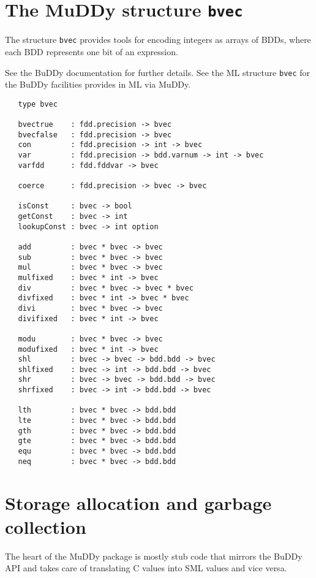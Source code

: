 \documentclass[12pt]{article}
\renewcommand{\t}[1]{\mbox{\tt #1}}
\newcommand{\Buddy}{BuDDy\xspace}
\newcommand{\Muddy}{MuDDy\xspace}
\begin{document}
\section{The \Muddy{} structure \t{bvec}}\label{bvec}

The structure \t{bvec} provides tools for encoding integers as arrays
of BDDs, where each BDD represents one bit of an expression.

See the \Buddy{} documentation \cite{BuDDy} for further details. See the ML structure \t{bvec}
for the \Buddy{} facilities provides in ML via \Muddy{}.

{\footnotesize
\begin{verbatim}
   type bvec

   bvectrue    : fdd.precision -> bvec 
   bvecfalse   : fdd.precision -> bvec 
   con         : fdd.precision -> int -> bvec
   var         : fdd.precision -> bdd.varnum -> int -> bvec
   varfdd      : fdd.fddvar -> bvec

   coerce      : fdd.precision -> bvec -> bvec

   isConst     : bvec -> bool
   getConst    : bvec -> int
   lookupConst : bvec -> int option

   add         : bvec * bvec -> bvec
   sub         : bvec * bvec -> bvec
   mul         : bvec * bvec -> bvec
   mulfixed    : bvec * int -> bvec
   div         : bvec * bvec -> bvec * bvec
   divfixed    : bvec * int -> bvec * bvec
   divi        : bvec * bvec -> bvec
   divifixed   : bvec * int -> bvec

   modu        : bvec * bvec -> bvec
   modufixed   : bvec * int -> bvec
   shl         : bvec -> bvec -> bdd.bdd -> bvec
   shlfixed    : bvec -> int -> bdd.bdd -> bvec
   shr         : bvec -> bvec -> bdd.bdd -> bvec
   shrfixed    : bvec -> int -> bdd.bdd -> bvec

   lth         : bvec * bvec -> bdd.bdd
   lte         : bvec * bvec -> bdd.bdd
   gth         : bvec * bvec -> bdd.bdd
   gte         : bvec * bvec -> bdd.bdd
   equ         : bvec * bvec -> bdd.bdd
   neq         : bvec * bvec -> bdd.bdd
\end{verbatim}}

\section{Storage allocation and garbage collection}
\label{sec:technical-details}

The heart of the \Muddy package is mostly stub code that mirrors the
\Buddy API and takes care of translating C values into SML values and
vice versa.
\end{document}
